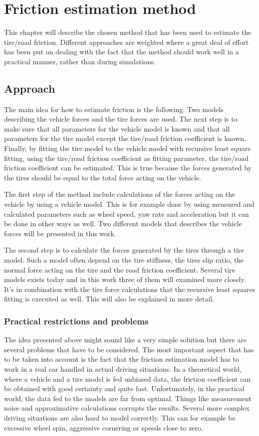 \chapter{Friction estimation method}

This chapter will describe the chosen method that has been used to estimate the tire/road friction. Different approaches are weighted where a great deal of effort has been put on dealing with the fact that the method should work well in a practical manner, rather than during simulations.

\section{Approach}
The main idea for how to estimate friction is the following. Two models describing the vehicle forces and the tire forces are used. The next step is to make sure that all parameters for the vehicle model is known and that all parameters for the tire model except the tire/road friction coefficient is known. Finally, by fitting the tire model to the vehicle model with recursive least square fitting, using the tire/road friction coefficient as fitting parameter, the tire/road friction coefficient can be estimated. This is true because the forces generated by the tires should be equal to the total force acting on the vehicle.

The first step of the method include calculations of the forces acting on the vehicle by using a vehicle model. This is for example done by using measured and calculated parameters such as wheel speed, yaw rate and acceleration but it can be done in other ways as well. Two different models that describes the vehicle forces will be presented in this work. 

The second step is to calculate the forces generated by the tires through a tire model. Such a model often depend on the tire stiffness, the tires slip ratio, the normal force acting on the tire and the road friction coefficient. Several tire models exists today and in this work three of them will examined more closely. It's in combination with the tire force calculations that the recursive least squares fitting is executed as well. This will also be explained in more detail. 

\subsection{Practical restrictions and problems}
The idea presented above might sound like a very simple solution but there are several problems that have to be considered. The most important aspect that has to be taken into account is the fact that the friction estimation model has to work in a real car handled in actual driving situations. In a theoretical world, where a vehicle and a tire model is fed unbiased data, the friction coefficient can be obtained with good certainty and quite fast. Unfortunately, in the practical world, the data fed to the models are far from optimal. Things like measurement noise and approximative calculations corrupts the results. Several more complex driving situations are also hard to model correctly. This can for example be excessive wheel spin, aggressive cornering or speeds close to zero.

